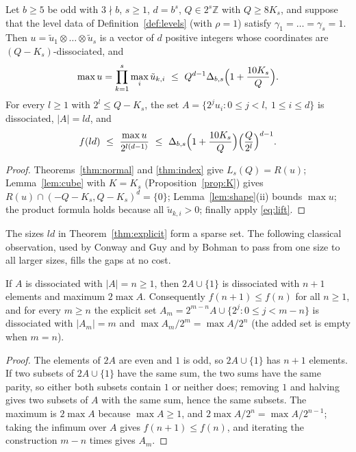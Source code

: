\documentclass[12pt]{article}
\newcommand{\Z}{\mathbb{Z}}
\newcommand{\dcube}[1]{(-#1,#1)}
\begin{document}
\begin{theorem}\label{thm:explicit}
Let $b\ge5$ be odd with $3\nmid b$, $s\ge1$, $d=b^s$, $Q\in2^s\Z$ with $Q\ge8K_s$, and suppose that the level data of
Definition~\ref{def:levels} (with $\rho=1$) satisfy $\gamma_1=\dots=\gamma_s=1$. Then $u=\tilde u_1\otimes\dots\otimes\tilde u_s$
is a vector of $d$ positive integers whose coordinates are $(Q-K_s)$-dissociated, and
\[
\max u=\prod_{k=1}^s\max_i\tilde u_{k,i}\ \le\ Q^{d-1}\Delta_{b,s}\Bigl(1+\frac{10K_s}{Q}\Bigr).
\]
For every $l\ge1$ with $2^l\le Q-K_s$, the set $A=\{2^ju_i:0\le j<l,\ 1\le i\le d\}$ is dissociated, $|A|=ld$, and
\[
f(ld)\ \le\ \frac{\max u}{2^{l(d-1)}}\ \le\ \Delta_{b,s}\Bigl(1+\frac{10K_s}{Q}\Bigr)\Bigl(\frac{Q}{2^l}\Bigr)^{d-1}.
\]
\end{theorem}
\begin{proof}
Theorems~\ref{thm:normal} and \ref{thm:index} give $L_s(Q)=R(u)$; Lemma~\ref{lem:cube} with $K=K_s$
(Proposition~\ref{prop:K}) gives $R(u)\cap\dcube{Q-K_s}^d=\{0\}$; Lemma~\ref{lem:shape}(ii) bounds $\max u$; the product
formula holds because all $\tilde u_{k,i}>0$; finally apply \eqref{eq:lift}.
\end{proof}

The sizes $ld$ in Theorem~\ref{thm:explicit} form a sparse set. The following classical observation, used by Conway and
Guy and by Bohman \cite{Bo98} to pass from one size to all larger sizes, fills the gaps at no cost.

\begin{lemma}[monotonicity]\label{lem:mono}
If $A$ is dissociated with $|A|=n\ge1$, then $2A\cup\{1\}$ is dissociated with $n+1$ elements and maximum $2\max A$.
Consequently $f(n+1)\le f(n)$ for all $n\ge1$, and for every $m\ge n$ the explicit set
$A_m=2^{m-n}A\cup\{2^j:0\le j<m-n\}$ is dissociated with $|A_m|=m$ and $\max A_m/2^{m}=\max A/2^{n}$
(the added set is empty when $m=n$).
\end{lemma}
\begin{proof}
The elements of $2A$ are even and $1$ is odd, so $2A\cup\{1\}$ has $n+1$ elements. If two subsets of $2A\cup\{1\}$ have
the same sum, the two sums have the same parity, so either both subsets contain $1$ or neither does; removing $1$ and
halving gives two subsets of $A$ with the same sum, hence the same subsets. The maximum is $2\max A$ because $\max A\ge1$,
and $2\max A/2^{n}=\max A/2^{n-1}$; taking the infimum over $A$ gives $f(n+1)\le f(n)$, and iterating the construction
$m-n$ times gives $A_m$.
\end{proof}
\end{document}
